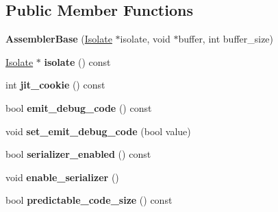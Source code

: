 \subsection*{Public Member Functions}
\begin{DoxyCompactItemize}
\item 
{\bfseries Assembler\+Base} (\hyperlink{classv8_1_1internal_1_1_isolate}{Isolate} $\ast$isolate, void $\ast$buffer, int buffer\+\_\+size)\hypertarget{classv8_1_1internal_1_1_assembler_base_a7ffa22cc463c9ee16ed46bfa38a5cd5b}{}\label{classv8_1_1internal_1_1_assembler_base_a7ffa22cc463c9ee16ed46bfa38a5cd5b}

\item 
\hyperlink{classv8_1_1internal_1_1_isolate}{Isolate} $\ast$ {\bfseries isolate} () const \hypertarget{classv8_1_1internal_1_1_assembler_base_a51294386a61dda31ed1488228c48211a}{}\label{classv8_1_1internal_1_1_assembler_base_a51294386a61dda31ed1488228c48211a}

\item 
int {\bfseries jit\+\_\+cookie} () const \hypertarget{classv8_1_1internal_1_1_assembler_base_a47d3778081925b5ecf685b1a475c8057}{}\label{classv8_1_1internal_1_1_assembler_base_a47d3778081925b5ecf685b1a475c8057}

\item 
bool {\bfseries emit\+\_\+debug\+\_\+code} () const \hypertarget{classv8_1_1internal_1_1_assembler_base_afc598637650acda081c8ebedb21ae3fc}{}\label{classv8_1_1internal_1_1_assembler_base_afc598637650acda081c8ebedb21ae3fc}

\item 
void {\bfseries set\+\_\+emit\+\_\+debug\+\_\+code} (bool value)\hypertarget{classv8_1_1internal_1_1_assembler_base_a1bcbeda264b5026c463490820c91ffab}{}\label{classv8_1_1internal_1_1_assembler_base_a1bcbeda264b5026c463490820c91ffab}

\item 
bool {\bfseries serializer\+\_\+enabled} () const \hypertarget{classv8_1_1internal_1_1_assembler_base_a43270aa31fe8878c96b1cb2f07e11c17}{}\label{classv8_1_1internal_1_1_assembler_base_a43270aa31fe8878c96b1cb2f07e11c17}

\item 
void {\bfseries enable\+\_\+serializer} ()\hypertarget{classv8_1_1internal_1_1_assembler_base_a602b8f228f5491bdf8d02e7f3a55fdc9}{}\label{classv8_1_1internal_1_1_assembler_base_a602b8f228f5491bdf8d02e7f3a55fdc9}

\item 
bool {\bfseries predictable\+\_\+code\+\_\+size} () const \hypertarget{classv8_1_1internal_1_1_assembler_base_afdc8e88acea34bc05e20f10a7e511264}{}\label{classv8_1_1internal_1_1_assembler_base_afdc8e88acea34bc05e20f10a7e511264}


\end{DoxyCompactItemize}
